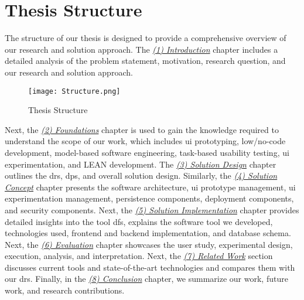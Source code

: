 \clearpage

\section{Thesis Structure}
\label{introduction:section:structure}
The structure of our thesis is designed to provide a comprehensive overview of our research and solution approach.
The \textit{\hyperref[chap:introduction]{(1) Introduction}} chapter includes a detailed analysis of the problem statement, motivation, research question, and our research and solution approach.

\begin{figure}[htbp!]
    \centering
    \texttt{[image: Structure.png]}
    \caption{Thesis Structure}
    \label{intro:fig:structure}
\end{figure}

Next, the \textit{\hyperref[chap:foundations]{(2) Foundations}} chapter is used to gain the knowledge required to understand the scope of our work, which includes \ac{ui} prototyping, low/no-code development, model-based software engineering, task-based usability testing, \ac{ui} experimentation, and LEAN development.
The \textit{\hyperref[chap:design]{(3) Solution Design}} chapter outlines the \ac{dr}s, \ac{dp}s, and overall solution design. 
Similarly, the \textit{\hyperref[chap:concept]{(4) Solution Concept}} chapter presents the software architecture, \ac{ui} prototype management, \ac{ui} experimentation management, persistence components, deployment components, and security components.
Next, the \textit{\hyperref[chap:implementation]{(5) Solution Implementation}} chapter provides detailed insights into the tool \ac{df}s, explains the software tool we developed, technologies used, frontend and backend implementation, and database schema. 
Next, the \textit{\hyperref[chap:evaluation]{(6) Evaluation}} chapter showcases the user study, experimental design, execution, analysis, and interpretation. 
Next, the \textit{\hyperref[chap:relatedWork]{(7) Related Work}} section discusses current tools and state-of-the-art technologies and compares them with our \ac{dr}s.
Finally, in the \textit{\hyperref[chap:conclusion]{(8) Conclusion}} chapter, we summarize our work, future work, and research contributions.
